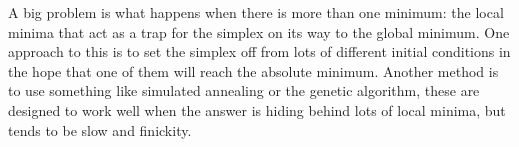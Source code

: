 \documentclass[11pt,a4paper]{scrartcl}
\begin{document}
A big problem is what happens when there is more than one minimum: the
local minima that act as a trap for the simplex on its way to the
global minimum. One approach to this is to set the simplex off from
lots of different initial conditions in the hope that one of them will
reach the absolute minimum. Another method is to use something like
simulated annealing or the genetic algorithm, these are designed to
work well when the answer is hiding behind lots of local minima, but
tends to be slow and finickity.
\end{document}
